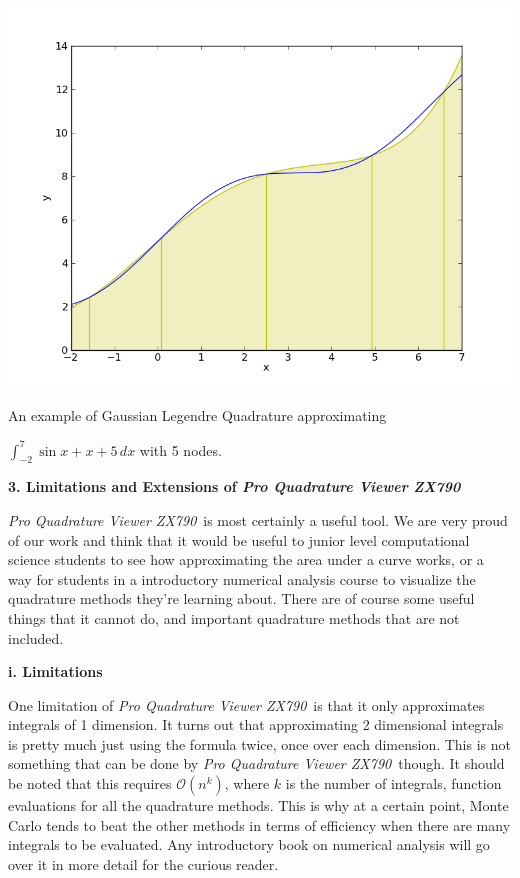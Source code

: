 \documentclass[12pt]{article}
\newcommand{\newLine}{\vspace{5mm}}
\newcommand{\appname}{\textit{Pro Quadrature Viewer ZX790}}
\newcommand{\nextsection}[1]{\newpage\noindent\Large\textbf{#1}\vspace{10mm}\normalsize}
\newcommand{\nextsubsection}[1]{\newLine \noindent \large \textbf{#1} \normalsize}
\newcommand{\integral}[3]{\text{$\int^{#2}_{#1} #3\,dx$}}
\begin{document}
\begin{center}
\includegraphics[scale=0.5]{sinXplusXgaussian.png}

\small An example of Gaussian Legendre Quadrature approximating 

$\integral{-2}{7}{\sin{x}+x+5}$ with 5 nodes. \normalsize
\end{center}

\nextsection{3. Limitations and Extensions of \appname}

\appname\, is most certainly a useful tool. We are very proud of our work and think that it would be useful to junior level computational science students to see how approximating the area under a curve works, or a way for students in a introductory numerical analysis course to visualize the quadrature methods they're learning about. There are of course some useful things that it cannot do, and important quadrature methods that are not included.

\nextsubsection{i. Limitations}

\newLine One limitation of \appname\,  is that it only approximates integrals of 1 dimension. It turns out that approximating 2 dimensional integrals is pretty much just using the formula twice, once over each dimension. This is not something that can be done by \appname\, though. It should be noted that this requires $\mathcal{O}(n^k)$, where $k$ is the number of integrals, function evaluations for all the quadrature methods. This is why at a certain point, Monte Carlo tends to beat the other methods in terms of efficiency when there are many integrals to be evaluated. Any introductory book on numerical analysis will go over it in more detail for the curious reader.
\end{document}
